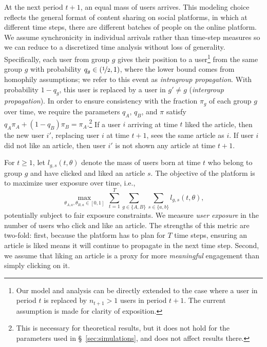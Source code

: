 \documentclass[letterpaper]{article} %
\begin{document}
At the next period $t+1$, an equal mass of users arrives.
This modeling choice reflects the general format of content sharing on social platforms, in which at different time steps, there are different batches of people on the online platform.
We assume synchronicity in individual arrivals rather than time-step measures so we can reduce to a discretized time analysis without loss of generality.
Specifically, each user from group $g$ gives their position to a user\footnote{Our model and analysis can be directly extended to the case where a user in period $t$ is replaced by $n_{t+1}>1$ users in period $t+1$. The current assumption is made for clarity of exposition.} from the same group $g$ with probability $q_g\in (\nicefrac{1}{2},1)$, where the lower bound comes from homophily assumptions; we refer to this event as \emph{intragroup propagation}.
With probability $1-q_g$, this user is replaced by a user in $g' \neq g$ (\emph{intergroup propagation}).
In order to ensure consistency with the fraction $\pi_g$ of each group $g$ over time, we require the parameters $q_A$, $q_B$, and $\pi$  satisfy $ q_A \pi_A + (1-q_B) \pi_B = \pi_A.$\footnote{This is necessary for theoretical results, but it does not hold for the parameters used in \S~\ref{sec:simulations}, and does not affect results there.}
If a user $i$ arriving at time $t$ liked the article, then the new user $i'$, replacing  user $i$ at time $t+1$, sees the same article as $i$.
If user $i$ did not like an article, then user $i'$ is not shown any article at time $t+1$.

For $t\geq 1$, let $l_{g,s}(t,\theta)$ denote the mass of users born at time $t$ who belong to group $g$ and have clicked and liked an article $s$.
The objective of the platform is to maximize user exposure  over time, i.e.,
\footnotesize
\begin{equation}
     \max_{\theta_{A,a}, \theta_{B,a} \in [0,1]} \, \sum_{t = 1}^T \sum_{g\in \{A,B\}}\sum_{s\in \{a,b\}} l_{g,s}(t,\theta), \label{eq:platform-optimization-problem-general}
\end{equation}
\normalsize
potentially subject to  fair exposure constraints.
We measure \emph{user exposure} in the number of users who click and like an article.
The strengths of this metric are two-fold: first, because the platform has to plan for $T$ time steps, ensuring an article is liked means it will continue to propagate in the next time step.
Second, we assume that liking an article is a proxy for more \emph{meaningful} engagement than simply clicking on it.
\end{document}
